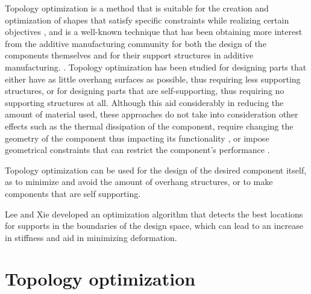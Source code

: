 \documentclass[../main.tex]{subfiles}
\begin{document}
Topology optimization is a method that is suitable for the creation and optimization of shapes that satisfy specific constraints while realizing certain objectives \cite{bendsoeTopologyOptimization2002},  and is a well-known technique that has been obtaining more interest from the additive manufacturing community for both the design of the components themselves and for their support structures in additive manufacturing. . Topology optimization has been studied for designing parts that either have as little overhang surfaces as possible, thus requiring less supporting structures, or for designing parts that are self-supporting, thus requiring no supporting structures at all. Although this aid considerably in reducing the amount of material used, these approaches do not take into consideration other effects such as the thermal dissipation of the component, require changing the geometry of the component thus impacting its functionality \cite{yeTopologyOptimisationSelfsupporting2023}, or impose geometrical constraints that can restrict the component's performance \cite{langelaarTOPOLOGYOPTIMIZATIONADDITIVE2016}.

Topology optimization can be used for the design of the desired component itself, as to minimize and avoid the amount of overhang structures, or to make components that are self supporting.


Lee and Xie \cite{leeSimultaneouslyOptimizingSupports2021} developed an optimization algorithm that detects the best locations for supports in the boundaries of the design space, which can lead to an increase in stiffness and aid in minimizing deformation.

\section{Topology optimization}
\end{document}
